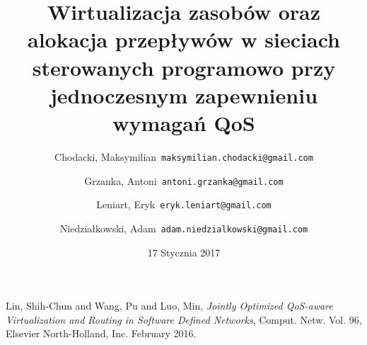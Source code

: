 \documentclass{article}
\title{Wirtualizacja zasobów oraz alokacja przepływów w sieciach sterowanych programowo przy jednoczesnym zapewnieniu wymagań QoS}
\author{
  Chodacki, Maksymilian\      \texttt{maksymilian.chodacki@gmail.com}
  \and
  Grzanka, Antoni\      \texttt{antoni.grzanka@gmail.com}
  \and
  Leniart, Eryk\      \texttt{eryk.leniart@gmail.com}
  \and
  Niedziałkowski, Adam\      \texttt{adam.niedzialkowski@gmail.com}
}
\date{17 Stycznia 2017}
\begin{document}
\maketitle







\begin{thebibliography}{9}

  Lin, Shih-Chun and Wang, Pu and Luo, Min,
  \emph{Jointly Optimized QoS-aware Virtualization and Routing in Software Defined Networks},
  Comput. Netw. Vol. 96,
  Elsevier North-Holland, Inc.
  February 2016.
  
\end{thebibliography}
\end{document}
